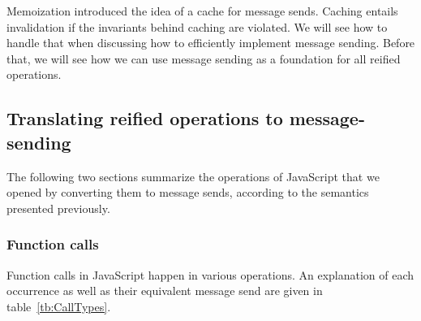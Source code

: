 Memoization introduced the idea of a cache for message sends. Caching entails
invalidation if the invariants behind caching are violated. We will see how to
handle that when discussing how to efficiently implement message sending.
Before that, we will see how we can use message sending as a foundation for all
reified operations.

\subsection{Translating reified operations to message-sending}

The following two sections summarize the operations of JavaScript that we
opened by converting them to message sends, according to the semantics presented
previously.

\subsubsection{Function calls}

Function calls in JavaScript happen in various operations. An explanation of
each occurrence as well as their equivalent message send are given in
table~\ref{tb:CallTypes}.


